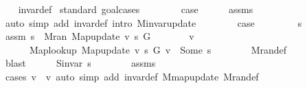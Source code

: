 \begin{isabellebody}
%
\isadelimproof
\ \ %
\endisadelimproof
%
\isatagproof
{}\isamarkupfalse%
\ invar{\isacharunderscore}{\kern0pt}def\isanewline
{}\isamarkupfalse%
\ {\isacharparenleft}{\kern0pt}standard{\isacharcomma}{\kern0pt}\ goal{\isacharunderscore}{\kern0pt}cases{\isacharparenright}{\kern0pt}\isanewline
\ \ \isamarkupfalse%
\ {}\isanewline
\ \ \isamarkupfalse%
\ {\isacharquery}{\kern0pt}case\isanewline
\ \ \ \ \isamarkupfalse%
\ assms{\isacharparenleft}{\kern0pt}{}{\isacharparenright}{\kern0pt}\isanewline
\ \ \ \ \isamarkupfalse%
\ {\isacharparenleft}{\kern0pt}auto\ simp\ add{\isacharcolon}{\kern0pt}\ invar{\isacharunderscore}{\kern0pt}def\ intro{\isacharcolon}{\kern0pt}\ M{\isachardot}{\kern0pt}invar{\isacharunderscore}{\kern0pt}update{\isacharparenright}{\kern0pt}\isanewline
{}\isamarkupfalse%
\isanewline
\ \ \isamarkupfalse%
\ {}\isanewline
\ \ \isamarkupfalse%
\ {\isacharquery}{\kern0pt}case\isanewline
\ \ \isamarkupfalse%
\isanewline
\ \ \ \ \isamarkupfalse%
\ s{\isacharprime}{\kern0pt}\isanewline
\ \ \ \ \isamarkupfalse%
\ assm{\isacharcolon}{\kern0pt}\ {\isachardoublequoteopen}s{\isacharprime}{\kern0pt}\ {\isasymin}\ M{\isachardot}{\kern0pt}ran\ {\isacharparenleft}{\kern0pt}Map{\isacharunderscore}{\kern0pt}update\ v\ s\ G{\isacharparenright}{\kern0pt}{\isachardoublequoteclose}\isanewline
\ \ \ \ \isamarkupfalse%
\ \isamarkupfalse%
\ v{\isacharprime}{\kern0pt}\ \isanewline
\ \ \ \ \ \ {\isachardoublequoteopen}Map{\isacharunderscore}{\kern0pt}lookup\ {\isacharparenleft}{\kern0pt}Map{\isacharunderscore}{\kern0pt}update\ v\ s\ G{\isacharparenright}{\kern0pt}\ v{\isacharprime}{\kern0pt}\ {\isacharequal}{\kern0pt}\ Some\ s{\isacharprime}{\kern0pt}{\isachardoublequoteclose}\isanewline
\ \ \ \ \ \ \isamarkupfalse%
\ M{\isachardot}{\kern0pt}ran{\isacharunderscore}{\kern0pt}def\isanewline
\ \ \ \ \ \ \isamarkupfalse%
\ blast\isanewline
\ \ \ \ \isamarkupfalse%
\ {\isachardoublequoteopen}S{\isachardot}{\kern0pt}invar\ s{\isacharprime}{\kern0pt}{\isachardoublequoteclose}\isanewline
\ \ \ \ \ \ \isamarkupfalse%
\ assms\isanewline
\ \ \ \ \ \ \isamarkupfalse%
\ {\isacharparenleft}{\kern0pt}cases\ {\isachardoublequoteopen}v{\isacharprime}{\kern0pt}\ {\isacharequal}{\kern0pt}\ v{\isachardoublequoteclose}{\isacharparenright}{\kern0pt}\ {\isacharparenleft}{\kern0pt}auto\ simp\ add{\isacharcolon}{\kern0pt}\ invar{\isacharunderscore}{\kern0pt}def\ M{\isachardot}{\kern0pt}map{\isacharunderscore}{\kern0pt}update\ M{\isachardot}{\kern0pt}ran{\isacharunderscore}{\kern0pt}def{\isacharparenright}{\kern0pt}\isanewline

\end{isabellebody}

